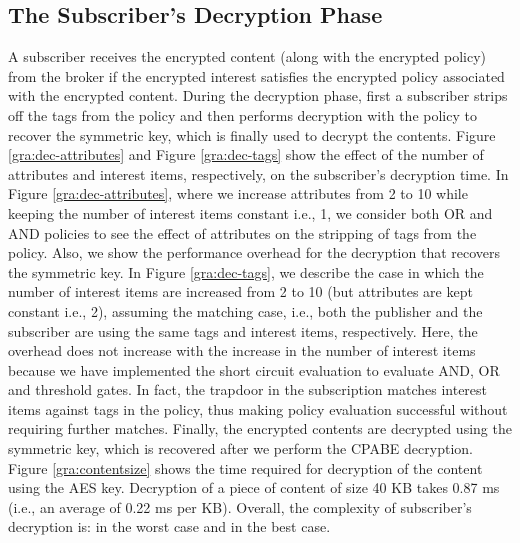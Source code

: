 \documentclass[epsfig,a4paper,11pt,titlepage]{book}
\numberwithin{algorithm}{chapter}
\begin{document}
\subsection{The Subscriber's Decryption Phase}
A subscriber receives the encrypted content (along with the encrypted policy) from the broker if the encrypted interest satisfies the encrypted policy associated with the encrypted content. During the decryption phase, first a subscriber strips off the tags from the policy and then performs decryption with the policy to recover the symmetric key, which is finally used to decrypt the contents. Figure \ref{gra:dec-attributes} and Figure \ref{gra:dec-tags} show the effect of the number of attributes and interest items, respectively, on the subscriber's decryption time. In Figure \ref{gra:dec-attributes}, where we increase attributes from 2 to 10 while keeping the number of interest items constant i.e., 1, we consider both OR and AND policies to see the effect of attributes on the stripping of tags from the policy. Also, we show the performance overhead for the decryption that recovers the symmetric key. In Figure \ref{gra:dec-tags}, we describe the case in which the number of interest items are increased from 2 to 10 (but attributes are kept constant i.e., 2), assuming the matching case, i.e., both the publisher and the subscriber are using the same tags and interest items, respectively. Here, the overhead does not increase with the increase in the number of interest items because we have implemented the short circuit evaluation to evaluate AND, OR and threshold gates. In fact, the trapdoor in the subscription matches interest items against tags in the policy, thus making policy evaluation successful without requiring further matches. Finally, the encrypted contents are decrypted using the symmetric key, which is recovered after we perform the \gls{CPABE} decryption. Figure \ref{gra:contentsize} shows the time required for decryption of the content using the \gls{AES} key. Decryption of a piece of content of size 40 \gls{KB} takes 0.87 \gls{ms} (i.e., an average of 0.22 \gls{ms} per \gls{KB}). Overall, the complexity of subscriber's decryption is:  in the worst case and  in the best case.
\end{document}
